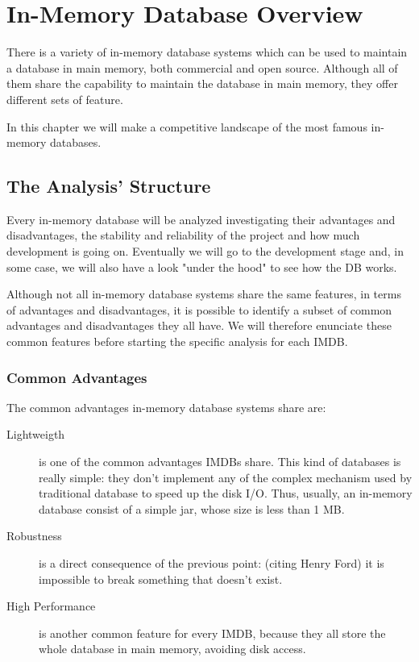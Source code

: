 \chapter{In-Memory Database Overview}
	There is a variety of in-memory database systems which can be used to maintain a 
	database in main memory, both commercial and open source. Although all of them share the capability 
	to maintain the database in main memory, they offer different sets of feature. 
	
	In this chapter we will make a competitive landscape of the most famous in-memory databases.
	
	\section{The Analysis' Structure}
	Every in-memory database will be analyzed investigating 
	their advantages and disadvantages, the stability and reliability of the project 
	and how much development is going on. Eventually we will go to the development stage and, 
	in some case, we will also have a look "under the hood" to see how the DB works.
	
	Although not all in-memory database systems share the same features, in terms of advantages and disadvantages, it is possible to identify a subset of common advantages and disadvantages they all have. We will therefore enunciate these common features before starting the specific analysis for each IMDB.
	
	\subsection{Common Advantages}
	The common advantages in-memory database systems share are:
	
	\begin{description}
		\item[Lightweigth] is one of the common advantages IMDBs share. This kind of databases is really simple: they 
		don't implement any of the complex mechanism used by traditional database to speed up the disk I/O. Thus, 
		usually, an in-memory database consist of a simple jar, whose size is less than 1 MB. 
		\item[Robustness] is a direct consequence of the previous point: (citing Henry Ford) it is impossible to 
		break something that doesn't exist.
		\item[High Performance] is another common feature for every IMDB, because they all store the whole database 
		in main memory, avoiding disk access.
	\end{description}
	
